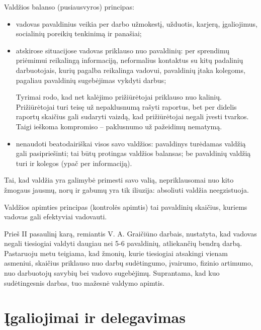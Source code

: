 Valdžios balanso (pusiausvyros) principas:
\begin{itemize}
  \item vadovas pavaldinius veikia per darbo užmokestį, užduotis, karjerą,
    įgaliojimus, socialinių poreikių tenkinimą ir panašiai;
  \item atskirose situacijose vadovas priklauso nuo pavaldinių: per
    sprendimų priėmimui reikalingą informaciją, neformalius kontaktus
    su kitų padalinių darbuotojais, kurių pagalba reikalinga vadovui,
    pavaldinių įtaka kolegoms, pagaliau pavaldinių sugebėjimas vykdyti
    darbus;
    \begin{exmp}
      Tyrimai rodo, kad net kalėjimo prižiūrėtojai priklauso nuo kalinių.
      Prižiūrėtojai turi teisę už nepaklusnumą rašyti raportus, bet
      per didelis raportų skaičius gali sudaryti vaizdą, kad prižiūrėtojai
      negali įvesti tvarkos. Taigi ieškoma kompromiso – paklusnumo
      už pažeidimų nematymą.
    \end{exmp}
  \item nenaudoti beatodairiškai visos savo valdžios: pavaldinys
    turėdamas valdžią gali pasipriešinti; tai būtų protingas valdžios
    balansas; be pavaldinių valdžią turi ir kolegos (ypač per informaciją).
\end{itemize}
Tai, kad valdžia yra galimybė primesti savo valią, nepriklausomai nuo
kito žmogaus jausmų, norų ir gabumų yra tik iliuzija: absoliuti valdžia
neegzistuoja.


Valdžios apimties principas (kontrolės apimtis) tai pavaldinių
skaičius, kuriems vadovas gali efektyviai vadovauti.

Prieš II pasaulinį karą, remiantis V. A. Graičiūno darbais,
nustatyta, kad vadovas negali tiesiogiai valdyti daugiau nei 5-6
pavaldinių, atliekančių bendrą darbą. Pastaruoju metu teigiama, kad
žmonių, kurie tiesiogiai atsakingi vienam asmeniui, skaičius
priklauso nuo darbų sudėtingumo, įvairumo, fizinio artimumo, nuo
darbuotojų savybių bei vadovo sugebėjimų. Suprantama, kad kuo
sudėtingesnis darbas, tuo mažesnė valdymo apimtis.

\section{Įgaliojimai ir delegavimas}


